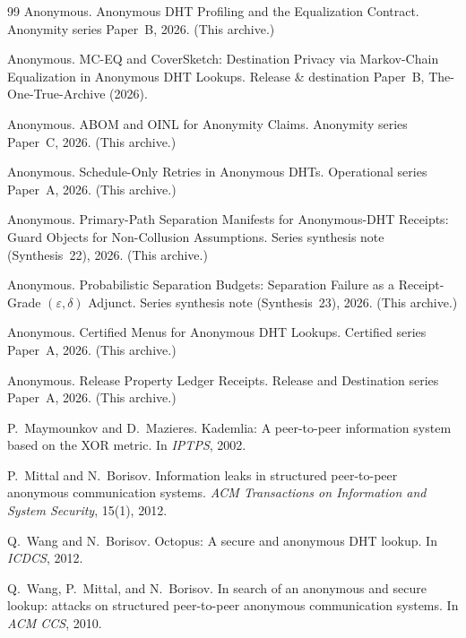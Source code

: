 \documentclass[11pt]{article}
\begin{document}
\begin{thebibliography}{99}
Anonymous.
\newblock Anonymous DHT Profiling and the Equalization Contract.
\newblock Anonymity series Paper~B, 2026. (This archive.)

Anonymous.
\newblock MC-EQ and CoverSketch: Destination Privacy via Markov-Chain Equalization in Anonymous DHT Lookups.
\newblock Release \& destination Paper~B, The-One-True-Archive (2026).

Anonymous.
\newblock ABOM and OINL for Anonymity Claims.
\newblock Anonymity series Paper~C, 2026. (This archive.)

Anonymous.
\newblock Schedule-Only Retries in Anonymous DHTs.
\newblock Operational series Paper~A, 2026. (This archive.)

Anonymous.
\newblock Primary-Path Separation Manifests for Anonymous-DHT Receipts: Guard Objects for Non-Collusion Assumptions.
\newblock Series synthesis note (Synthesis~22), 2026. (This archive.)

Anonymous.
\newblock Probabilistic Separation Budgets: Separation Failure as a Receipt-Grade $(\varepsilon,\delta)$ Adjunct.
\newblock Series synthesis note (Synthesis~23), 2026. (This archive.)

Anonymous.
\newblock Certified Menus for Anonymous DHT Lookups.
\newblock Certified series Paper~A, 2026. (This archive.)

Anonymous.
\newblock Release Property Ledger Receipts.
\newblock Release and Destination series Paper~A, 2026. (This archive.)

P.~Maymounkov and D.~Mazieres.
\newblock Kademlia: A peer-to-peer information system based on the XOR metric.
\newblock In \emph{IPTPS}, 2002.

P.~Mittal and N.~Borisov.
\newblock Information leaks in structured peer-to-peer anonymous communication systems.
\newblock \emph{ACM Transactions on Information and System Security}, 15(1), 2012.

Q.~Wang and N.~Borisov.
\newblock Octopus: A secure and anonymous DHT lookup.
\newblock In \emph{ICDCS}, 2012.

Q.~Wang, P.~Mittal, and N.~Borisov.
\newblock In search of an anonymous and secure lookup: attacks on structured peer-to-peer anonymous communication systems.
\newblock In \emph{ACM CCS}, 2010.


\end{thebibliography}
\end{document}
